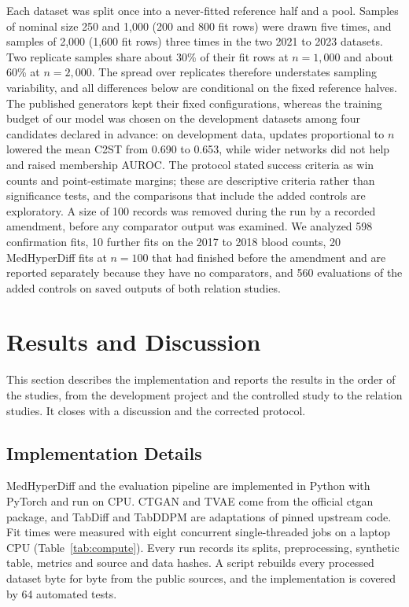 \documentclass[conference]{IEEEtran}
\begin{document}
Each dataset was split once into a never-fitted reference half and a pool. Samples of nominal size 250 and 1,000 (200 and 800 fit rows) were drawn five times, and samples of 2,000 (1,600 fit rows) three times in the two 2021 to 2023 datasets. Two replicate samples share about 30\% of their fit rows at $n = 1{,}000$ and about 60\% at $n = 2{,}000$. The spread over replicates therefore understates sampling variability, and all differences below are conditional on the fixed reference halves. The published generators kept their fixed configurations, whereas the training budget of our model was chosen on the development datasets among four candidates declared in advance: on development data, updates proportional to $n$ lowered the mean C2ST from 0.690 to 0.653, while wider networks did not help and raised membership AUROC. The protocol stated success criteria as win counts and point-estimate margins; these are descriptive criteria rather than significance tests, and the comparisons that include the added controls are exploratory. A size of 100 records was removed during the run by a recorded amendment, before any comparator output was examined. We analyzed 598 confirmation fits, 10 further fits on the 2017 to 2018 blood counts, 20 MedHyperDiff fits at $n = 100$ that had finished before the amendment and are reported separately because they have no comparators, and 560 evaluations of the added controls on saved outputs of both relation studies.

\section{Results and Discussion}
\label{sec:results}

This section describes the implementation and reports the results in the order of the studies, from the development project and the controlled study to the relation studies. It closes with a discussion and the corrected protocol.

\subsection{Implementation Details}

MedHyperDiff and the evaluation pipeline are implemented in Python with PyTorch and run on CPU. CTGAN and TVAE come from the official ctgan package, and TabDiff and TabDDPM are adaptations of pinned upstream code. Fit times were measured with eight concurrent single-threaded jobs on a laptop CPU (Table~\ref{tab:compute}). Every run records its splits, preprocessing, synthetic table, metrics and source and data hashes. A script rebuilds every processed dataset byte for byte from the public sources, and the implementation is covered by 64 automated tests.
\end{document}
